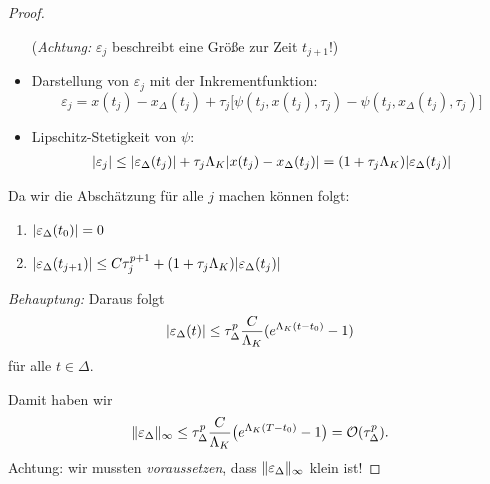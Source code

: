\begin{proof}
\begin{itemize}[leftmargin=*]
		(\textit{Achtung:} $\varepsilon_j$ beschreibt eine Größe zur Zeit $t_{j+1}$!)
		\item Darstellung von $\varepsilon_j$ mit der Inkrementfunktion:
		\begin{equation*}
			\varepsilon_j
			=x (t_j)-x_\Delta (t_j)
			+\tau_j \Big[\psi (t_j,x(t_j),\tau_j)-\psi (t_j,x_\Delta (t_j),\tau_j) \Big]
		\end{equation*}
		\item Lipschitz-Stetigkeit von $\psi$:
		\begin{align*}
			\lvert \varepsilon_j \rvert
			\leq
			\lvert \varepsilon_{\Delta} (t_j) \rvert+\tau_j \Lambda_K \lvert x (t_j)-x_\Delta (t_j) \rvert
			=
			(1+\tau_j \Lambda_K ) \lvert \varepsilon_\Delta (t_j) \rvert
		\end{align*}
	\end{itemize}
	
	Da wir die Abschätzung für alle $j$ machen können folgt:
	\begin{enumerate}
		\item $\lvert \varepsilon_\Delta (t_0) \rvert =0$
		\item $\lvert \varepsilon_{\Delta} (t_{j+1}) \rvert
		\leq C \tau_j^{p+1}+(1+\tau_j \Lambda_K) \lvert \varepsilon_{\Delta} (t_j) \rvert$
	\end{enumerate}
	\emph{Behauptung:} Daraus folgt
	\begin{equation}
		\label{inequa:ineqerr1}
		\lvert \varepsilon_\Delta (t) \rvert
		\leq
		\tau_{\Delta}^p \frac{C}{\Lambda_K} (e^{\Lambda_K (t-t_0)}-1 )
	\end{equation}
	für alle $t \in \Delta$.
	
	Damit haben wir
	\begin{equation*}
		\lVert \varepsilon_\Delta \rVert_\infty
		\le
		\tau_\Delta^p \frac{C}{\Lambda_K} \big( e^{\Lambda_K (T-t_0)} - 1 \big)
		=
		\mathcal{O}(\tau_\Delta^p).
	\end{equation*}
	Achtung: wir mussten \emph{voraussetzen}, dass $\lVert \varepsilon_\Delta \rVert_\infty$ klein ist!
\end{proof}

